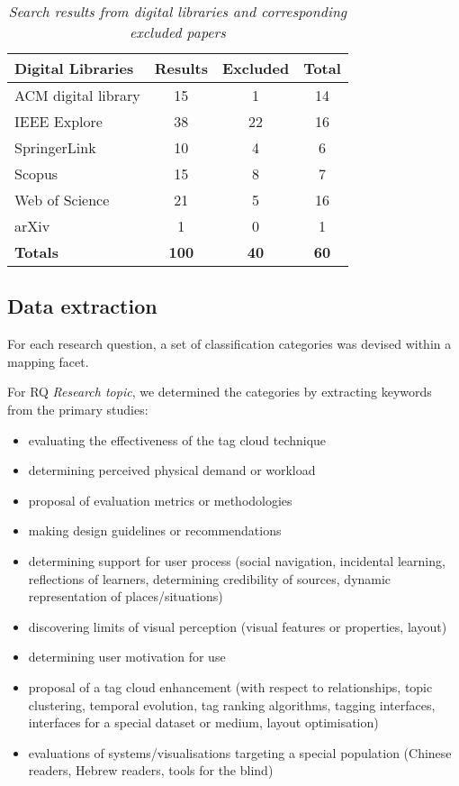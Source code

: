 \begin{table}
\centering
\caption{\textit{Search results from digital libraries and corresponding excluded papers}}
\begin{tabular}{|l|c|c|c|} \hline
\textbf{Digital Libraries}&\textbf{Results}&\textbf{Excluded}&\textbf{Total}\\ \hline
ACM digital library&15&1&14\\ \hline
IEEE Explore&38&22&16\\ \hline
SpringerLink&10&4&6\\ \hline
Scopus&15&8&7\\ \hline
Web of Science&21&5&16\\ \hline
arXiv&1&0&1\\ \hline
\textbf{Totals}&\textbf{100}&\textbf{40}&\textbf{60}\\
\hline\end{tabular}
\label{tab:searchresults2}
\end{table}

\subsection{Data extraction}\label{sect:dataextraction}

For each research question, a set of classification categories was devised within a mapping facet.

For RQ \textit{Research topic}, we determined the categories by extracting keywords from the primary studies:

\begin{itemize}
\item evaluating the effectiveness of the tag cloud technique
\item determining perceived physical demand or workload
\item proposal of evaluation metrics or methodologies
\item making design guidelines or recommendations
\item determining support for user process (social navigation, incidental learning, reflections of learners, determining credibility of sources, dynamic representation of places/situations)
\item discovering limits of visual perception (visual features or properties, layout)
\item determining user motivation for use
\item proposal of a tag cloud enhancement (with respect to relationships, topic clustering, temporal evolution, tag ranking algorithms, tagging interfaces, interfaces for a special dataset or medium, layout optimisation)
\item evaluations of systems/visualisations targeting a special population (Chinese readers, Hebrew readers, tools for the blind)
\end{itemize}


